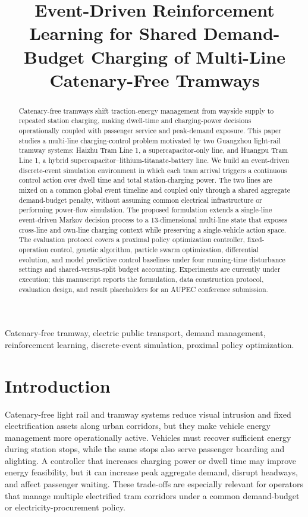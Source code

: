 \documentclass[conference]{IEEEtran}
\title{Event-Driven Reinforcement Learning for Shared Demand-Budget Charging of Multi-Line Catenary-Free Tramways}
\author{
\IEEEauthorblockN{Jun-Jie Zhao}
\IEEEauthorblockA{School of Electrical and Computer Engineering\\
The University of Sydney\\
Sydney, Australia\\
Email: \todo{author email}}
}
\begin{document}
\maketitle

\begin{abstract}
Catenary-free tramways shift traction-energy management from wayside supply to repeated station charging, making dwell-time and charging-power decisions operationally coupled with passenger service and peak-demand exposure. This paper studies a multi-line charging-control problem motivated by two Guangzhou light-rail tramway systems: Haizhu Tram Line 1, a supercapacitor-only line, and Huangpu Tram Line 1, a hybrid supercapacitor--lithium-titanate-battery line. We build an event-driven discrete-event simulation environment in which each tram arrival triggers a continuous control action over dwell time and total station-charging power. The two lines are mixed on a common global event timeline and coupled only through a shared aggregate demand-budget penalty, without assuming common electrical infrastructure or performing power-flow simulation. The proposed formulation extends a single-line event-driven Markov decision process to a 13-dimensional multi-line state that exposes cross-line and own-line charging context while preserving a single-vehicle action space. The evaluation protocol covers a proximal policy optimization controller, fixed-operation control, genetic algorithm, particle swarm optimization, differential evolution, and model predictive control baselines under four running-time disturbance settings and shared-versus-split budget accounting. Experiments are currently under execution; this manuscript reports the formulation, data construction protocol, evaluation design, and result placeholders for an AUPEC conference submission.
\end{abstract}

\begin{IEEEkeywords}
Catenary-free tramway, electric public transport, demand management, reinforcement learning, discrete-event simulation, proximal policy optimization.
\end{IEEEkeywords}

\section{Introduction}
Catenary-free light rail and tramway systems reduce visual intrusion and fixed electrification assets along urban corridors, but they make vehicle energy management more operationally active. Vehicles must recover sufficient energy during station stops, while the same stops also serve passenger boarding and alighting. A controller that increases charging power or dwell time may improve energy feasibility, but it can increase peak aggregate demand, disrupt headways, and affect passenger waiting. These trade-offs are especially relevant for operators that manage multiple electrified tram corridors under a common demand-budget or electricity-procurement policy.
\end{document}
